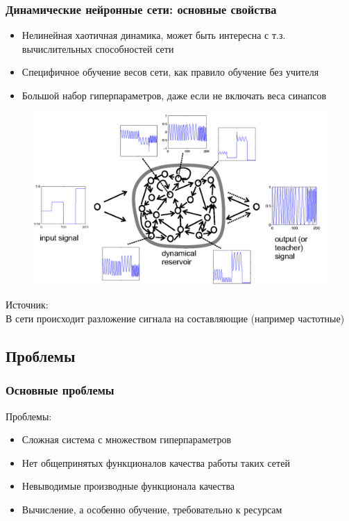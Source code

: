 \documentclass{beamer}
\begin{document}
\begin{frame}
\frametitle{Динамические нейронные сети: основные свойства}
\begin{itemize}
\item Нелинейная хаотичная динамика, может быть интересна с т.з. вычислительных способностей сети
\item Специфичное обучение весов сети, как правило обучение без учителя
\item Большой набор гиперпараметров, даже если не включать веса синапсов
\end{itemize}
\end{frame}
\begin{frame}
\begin{figure}
   \includegraphics[scale=0.6]{FreqGenSchema.png}
\end{figure}
\hspace*{5pt}\hbox{\scriptsize Источник:}\\

В сети происходит разложение сигнала на составляющие (например частотные)

\end{frame}

\subsection{Проблемы} 


\begin{frame}
\frametitle{Основные проблемы}
Проблемы:
\begin{itemize}
\item Сложная система с множеством гиперпараметров
\item Нет общепринятых функционалов качества работы таких сетей
\item Невыводимые производные функционала качества
\item Вычисление, а особенно обучение, требовательно к ресурсам
\end{itemize}
\end{frame}
\end{document}
